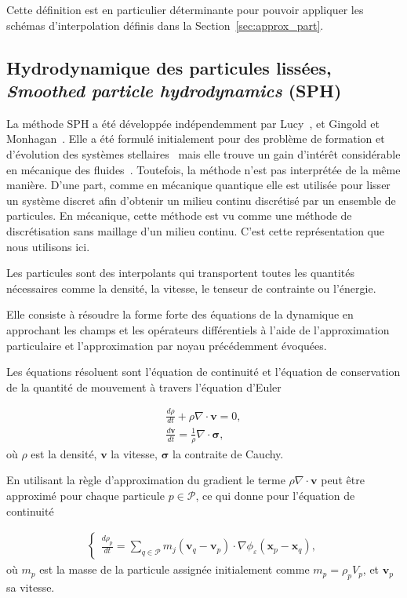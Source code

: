 Cette définition est en particulier déterminante pour pouvoir appliquer les schémas d'interpolation définis dans la Section~\ref{sec:approx_part}.

\subsection{Hydrodynamique des particules lissées, \textit{Smoothed particle hydrodynamics} (SPH)}

La méthode SPH a été développée indépendemment par Lucy~\cite{lucy_1977}, et Gingold et Monhagan~\cite{gingold_monaghan_sph_1977}. Elle a été formulé initialement pour des problème de formation et d'évolution des systèmes stellaires~\cite{hultman1999hierarchical} mais elle trouve un gain d'intérêt considérable en mécanique des fluides~\cite{PhysRevE.52.4899, SHADLOO201611}. Toutefois, la méthode n'est pas interprétée de la même manière. D'une part, comme en mécanique quantique elle est utilisée pour lisser un système discret afin d'obtenir un milieu continu discrétisé par un ensemble de particules. En mécanique, cette méthode est vu comme une méthode de discrétisation sans maillage d'un milieu continu. C'est cette représentation que nous utilisons ici.

Les particules sont des interpolants qui transportent toutes les quantités nécessaires comme la densité, la vitesse, le tenseur de contrainte ou l'énergie.

Elle consiste à résoudre la forme forte des équations de la dynamique en approchant les champs et les opérateurs différentiels à l'aide de l'approximation particulaire et l'approximation par noyau précédemment évoquées.

Les équations résoluent sont l'équation de continuité et l'équation de conservation de la quantité de mouvement à travers l'équation d'Euler

\begin{eqnarray*}
    \frac{d\rho}{dt} + \rho \nabla \cdot \bm{v} = 0, \\
    \frac{d\bm v}{dt} = \frac1\rho \nabla \cdot \bm \sigma,
\end{eqnarray*}où $\rho$ est la densité, $\bm v$ la vitesse, $\bm \sigma$ la contraite de Cauchy.

En utilisant la règle d'approximation du gradient le terme $\rho \nabla \cdot \bm{v}$ peut être approximé pour chaque particule $p \in \mathcal P$, ce qui donne pour l'équation de continuité

\begin{gather*}
    \left\{\begin{aligned}
        \frac{d\rho_p}{dt} = \sum_{q \in \mathcal P} m_j (\bm v_q - \bm v_p) \cdot \nabla \phi_\varepsilon(\bm x_p - \bm x_q),
    \end{aligned}  \right.
\end{gather*}où $m_p$ est la masse de la particule assignée initialement comme $m_p = \rho_p V_p$, et $\bm v_p$ sa vitesse.


